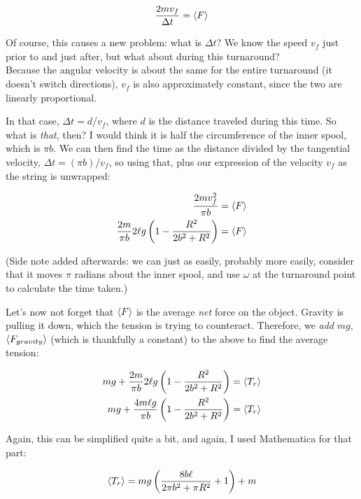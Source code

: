 \documentclass[8.01x]{subfiles}
\begin{document}
\begin{equation}
\frac{2 m v_f}{\Delta t} = \Braket{F}
\end{equation}

Of course, this causes a new problem: what is $\Delta t$? We know the speed $v_f$ just prior to and just after, but what about during this turnaround?\\
Because the angular velocity is about the same for the entire turnaround (it doesn't switch directions), $v_f$ is also approximately constant, since the two are linearly proportional.

In that case, $\Delta t = d/v_f$, where $d$ is the distance traveled during this time. So what is \emph{that}, then? I would think it is half the circumference of the inner spool, which is $\pi b$. We can then find the time as the distance divided by the tangential velocity, $\Delta t = (\pi b)/v_f$, so using that, plus our expression of the velocity $v_f$ as the string is unwrapped:

\begin{align}
\frac{2 m v_f^2}{\pi b} &= \Braket{F}\\
\frac{2 m}{\pi b} 2 \ell g \left(1 - \frac{R^2}{2 b^2 + R^2}\right) &= \Braket{F}
\end{align}

(Side note added afterwards: we can just as easily, probably more easily, consider that it moves $\pi$ radians about the inner spool, and use $\omega$ at the turnaround point to calculate the time taken.)

Let's now not forget that $\Braket{F}$ is the average \emph{net} force on the object. Gravity is pulling it down, which the tension is trying to counteract. Therefore, we \emph{add} $m g$, $\Braket{F_{gravity}}$ (which is thankfully a constant) to the above to find the average tension:

\begin{align}
m g + \frac{2 m}{\pi b} 2 \ell g \left(1 - \frac{R^2}{2 b^2 + R^2}\right) &= \Braket{T_r}\\
m g + \frac{4 m \ell g}{\pi b} \left(1 - \frac{R^2}{2 b^2 + R^2}\right) &= \Braket{T_r}
\end{align}

Again, this can be simplified quite a bit, and again, I used Mathematica for that part:

\begin{equation}
\Braket{T_r} = m g \left(\frac{8 b \ell}{2 \pi b^2 + \pi R^2} + 1\right) + m 
\end{equation}
\end{document}
